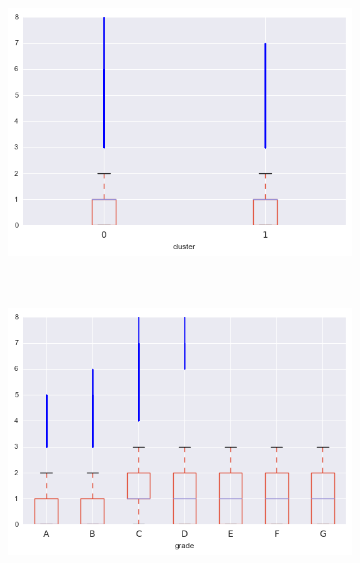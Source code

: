 \begin{anexosenv}
\begin{figure}[t!]
\begin{subfigure}[t]{0.5\textwidth}
            \centerline{\includegraphics[width=1.05\textwidth]{img/inq_last_6mths_by_cluster}}
        \end{subfigure}%
        ~ 
        \begin{subfigure}[t]{0.5\textwidth}
            \centering
   
            \centerline{\includegraphics[width=1.05\textwidth]{img/inq_last_6mths_by_grade}}

        \end{subfigure}
\end{figure}

\begin{figure}[t!]
    \centering
        \caption{revol\textunderscore bal }
        \begin{subfigure}[t]{0.5\textwidth}
            \centering


\end{subfigure}
\end{figure}
\end{anexosenv}
